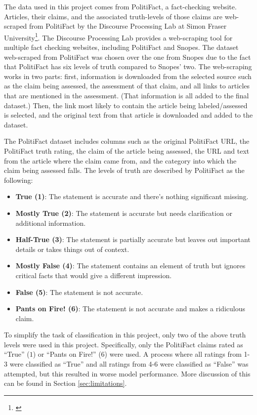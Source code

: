 \documentclass[12pt]{article}
\providecommand{\tightlist}{%
  \setlength{\itemsep}{0pt}\setlength{\parskip}{0pt}}
\begin{document}
The data used in this project comes from PolitiFact, a fact-checking
website. Articles, their claims, and the associated truth-levels of
those claims are web-scraped from PolitiFact by the Discourse Processing
Lab at Simon Fraser University\footnote{\citet{taboadaFakeNewsDetection}}.
The Discourse Processing Lab provides a web-scraping tool for multiple
fact checking websites, including PolitiFact and Snopes. The dataset
web-scraped from PolitiFact was chosen over the one from Snopes due to
the fact that PolitiFact has six levels of truth compared to Snopes'
two. The web-scraping works in two parts: first, information is
downloaded from the selected source such as the claim being assessed,
the assessment of that claim, and all links to articles that are
mentioned in the assessment. (That information is all added to the final
dataset.) Then, the link most likely to contain the article being
labeled/assessed is selected, and the original text from that article is
downloaded and added to the dataset.

The PolitiFact dataset includes columns such as the original PolitiFact
URL, the PolitiFact truth rating, the claim of the article being
assessed, the URL and text from the article where the claim came from,
and the category into which the claim being assessed falls. The levels
of truth are described by PolitiFact as the following:

\begin{itemize}
\tightlist
\item
  \textbf{True (1)}: The statement is accurate and there's nothing
  significant missing.
\item
  \textbf{Mostly True (2)}: The statement is accurate but needs
  clarification or additional information.
\item
  \textbf{Half-True (3)}: The statement is partially accurate but leaves
  out important details or takes things out of context.
\item
  \textbf{Mostly False (4)}: The statement contains an element of truth
  but ignores critical facts that would give a different impression.
\item
  \textbf{False (5)}: The statement is not accurate.
\item
  \textbf{Pants on Fire! (6)}: The statement is not accurate and makes a
  ridiculous claim.
\end{itemize}

To simplify the task of classification in this project, only two of the
above truth levels were used in this project. Specifically, only the
PolitiFact claims rated as ``True'' (\(1\)) or ``Pants on Fire!''
(\(6\)) were used. A process where all ratings from 1-3 were classified
as ``True'' and all ratings from 4-6 were classified as ``False'' was
attempted, but this resulted in worse model performance. More discussion
of this can be found in Section \ref{sec:limitations}.
\end{document}
